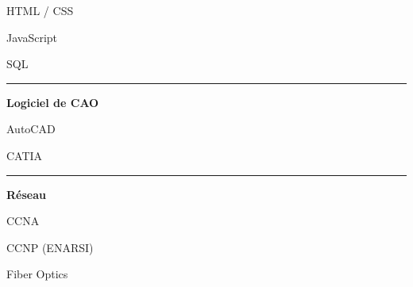 \documentclass[a4paper]{letter}
\newcommand{\divider}{\rule{\linewidth}{0.9pt}}
\begin{document}
\begin{minipage}[t]{0.40\textwidth}
\faCircleNotch \quad HTML / CSS

\faCircleNotch \quad JavaScript

\faCircleNotch \quad SQL

\divider


{\large \textbf{Logiciel de CAO}}

\faCircleNotch \quad AutoCAD

\faCircleNotch \quad CATIA

\divider



{\large \textbf{Réseau}}

\faNetworkWired \quad CCNA

\faNetworkWired \quad CCNP (ENARSI)

\faNetworkWired \quad Fiber Optics

\end{minipage}
\hfill
\end{document}
